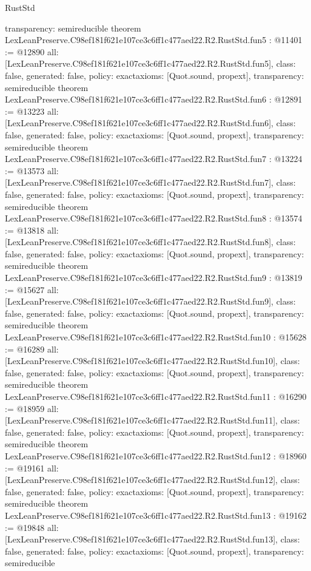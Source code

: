 \begin{lexlean}{RustStd}
\begin{coremodule}
{  transparency: semireducible
}
theorem LexLeanPreserve.C98ef181f621e107ce3c6ff1c477aed22.R2.RustStd.fun5 : @11401 := @12890 {
  all: [LexLeanPreserve.C98ef181f621e107ce3c6ff1c477aed22.R2.RustStd.fun5],
  class: false,
  generated: false,
  policy: exact{axioms: [Quot.sound, propext]},
  transparency: semireducible
}
theorem LexLeanPreserve.C98ef181f621e107ce3c6ff1c477aed22.R2.RustStd.fun6 : @12891 := @13223 {
  all: [LexLeanPreserve.C98ef181f621e107ce3c6ff1c477aed22.R2.RustStd.fun6],
  class: false,
  generated: false,
  policy: exact{axioms: [Quot.sound, propext]},
  transparency: semireducible
}
theorem LexLeanPreserve.C98ef181f621e107ce3c6ff1c477aed22.R2.RustStd.fun7 : @13224 := @13573 {
  all: [LexLeanPreserve.C98ef181f621e107ce3c6ff1c477aed22.R2.RustStd.fun7],
  class: false,
  generated: false,
  policy: exact{axioms: [Quot.sound, propext]},
  transparency: semireducible
}
theorem LexLeanPreserve.C98ef181f621e107ce3c6ff1c477aed22.R2.RustStd.fun8 : @13574 := @13818 {
  all: [LexLeanPreserve.C98ef181f621e107ce3c6ff1c477aed22.R2.RustStd.fun8],
  class: false,
  generated: false,
  policy: exact{axioms: [Quot.sound, propext]},
  transparency: semireducible
}
theorem LexLeanPreserve.C98ef181f621e107ce3c6ff1c477aed22.R2.RustStd.fun9 : @13819 := @15627 {
  all: [LexLeanPreserve.C98ef181f621e107ce3c6ff1c477aed22.R2.RustStd.fun9],
  class: false,
  generated: false,
  policy: exact{axioms: [Quot.sound, propext]},
  transparency: semireducible
}
theorem LexLeanPreserve.C98ef181f621e107ce3c6ff1c477aed22.R2.RustStd.fun10 : @15628 := @16289 {
  all: [LexLeanPreserve.C98ef181f621e107ce3c6ff1c477aed22.R2.RustStd.fun10],
  class: false,
  generated: false,
  policy: exact{axioms: [Quot.sound, propext]},
  transparency: semireducible
}
theorem LexLeanPreserve.C98ef181f621e107ce3c6ff1c477aed22.R2.RustStd.fun11 : @16290 := @18959 {
  all: [LexLeanPreserve.C98ef181f621e107ce3c6ff1c477aed22.R2.RustStd.fun11],
  class: false,
  generated: false,
  policy: exact{axioms: [Quot.sound, propext]},
  transparency: semireducible
}
theorem LexLeanPreserve.C98ef181f621e107ce3c6ff1c477aed22.R2.RustStd.fun12 : @18960 := @19161 {
  all: [LexLeanPreserve.C98ef181f621e107ce3c6ff1c477aed22.R2.RustStd.fun12],
  class: false,
  generated: false,
  policy: exact{axioms: [Quot.sound, propext]},
  transparency: semireducible
}
theorem LexLeanPreserve.C98ef181f621e107ce3c6ff1c477aed22.R2.RustStd.fun13 : @19162 := @19848 {
  all: [LexLeanPreserve.C98ef181f621e107ce3c6ff1c477aed22.R2.RustStd.fun13],
  class: false,
  generated: false,
  policy: exact{axioms: [Quot.sound, propext]},
  transparency: semireducible
}
\end{coremodule}
\end{lexlean}
